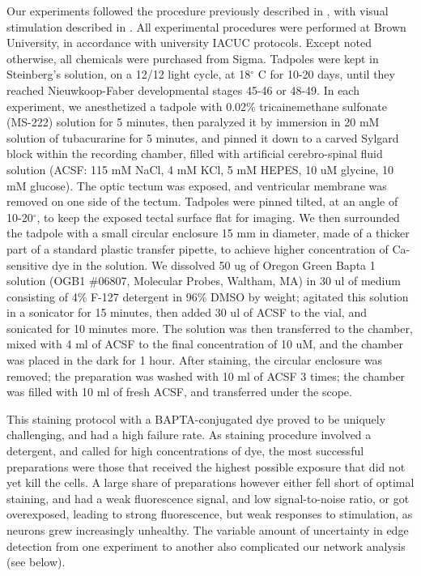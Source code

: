 \documentclass{article}
\begin{document}
Our experiments followed the procedure previously described in \citep{xu2011,truszkowski2017}, with visual stimulation described in \citep{khakhalin2014}. All experimental procedures were performed at Brown University, in accordance with university IACUC protocols. Except noted otherwise, all chemicals were purchased from Sigma. Tadpoles were kept in Steinberg’s solution, on a 12/12 light cycle, at 18$^\circ$ C for 10-20 days, until they reached Nieuwkoop-Faber developmental stages 45-46 or 48-49. In each experiment, we anesthetized a tadpole with 0.02\% tricainemethane sulfonate (MS-222) solution for 5 minutes, then paralyzed it by immersion in 20 mM solution of tubacurarine for 5 minutes, and pinned it down to a carved Sylgard block within the recording chamber, filled with artificial cerebro-spinal fluid solution (ACSF: 115 mM NaCl, 4 mM KCl, 5 mM HEPES, 10 uM glycine, 10 mM glucose). The optic tectum was exposed, and ventricular membrane was removed on one side of the tectum. Tadpoles were pinned tilted, at an angle of 10-20$^\circ$, to keep the exposed tectal surface flat for imaging. We then surrounded the tadpole with a small circular enclosure 15 mm in diameter, made of a thicker part of a standard plastic transfer pipette, to achieve higher concentration of Ca-sensitive dye in the solution. We dissolved 50 ug of Oregon Green Bapta 1 solution (OGB1 $\#$06807, Molecular Probes, Waltham, MA) in 30 ul of medium consisting of 4\% F-127 detergent in 96\% DMSO by weight; agitated this solution in a sonicator for 15 minutes, then added 30 ul of ACSF to the vial, and sonicated for 10 minutes more. The solution was then transferred to the chamber, mixed with 4 ml of ACSF to the final concentration of 10 uM, and the chamber was placed in the dark for 1 hour. After staining, the circular enclosure was removed; the preparation was washed with 10 ml of ACSF 3 times; the chamber was filled with 10 ml of fresh ACSF, and transferred under the scope.

This staining protocol with a BAPTA-conjugated dye proved to be uniquely challenging, and had a high failure rate. As staining procedure involved a detergent, and called for high concentrations of dye, the most successful preparations were those that received the highest possible exposure that did not yet kill the cells. A large share of preparations however either fell short of optimal staining, and had a weak fluorescence signal, and low signal-to-noise ratio, or got overexposed, leading to strong fluorescence, but weak responses to stimulation, as neurons grew increasingly unhealthy. The variable amount of uncertainty in edge detection from one experiment to another also complicated our network analysis (see below).
\end{document}
